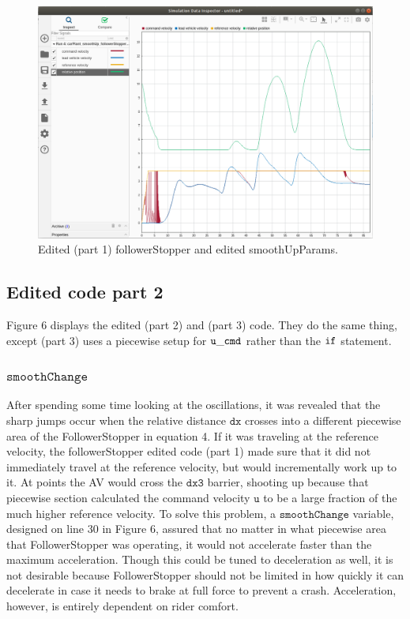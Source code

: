 \documentclass[12pt, letterpaper]{article}
\begin{document}
\begin{figure}[h!]
\begin{center}
\includegraphics[width=6in]{editedFS_editedSUP_1}
\caption{Edited (part 1) followerStopper and edited smoothUpParams.}
\label{default}
\end{center}
\end{figure}

\subsection{Edited code part 2}
Figure 6 displays the edited (part 2) and (part 3) code. They do the same thing, except (part 3) uses a piecewise setup for $\tt{u\_cmd}$ rather than the $\tt{if}$ statement.
\subsubsection{$\mathtt{smoothChange}$}
After spending some time looking at the oscillations, it was revealed that the sharp jumps occur when the relative distance $\mathtt{dx}$ crosses into a different piecewise area of the FollowerStopper in equation 4. If it was traveling at the reference velocity, the followerStopper edited code (part 1) made sure that it did not immediately travel at the reference velocity, but would incrementally work up to it. At points the AV would cross the $\mathtt{dx3}$ barrier, shooting up because that piecewise section calculated the command velocity $\mathtt{u}$ to be a large fraction of the much higher reference velocity. To solve this problem, a $\mathtt{smoothChange}$ variable, designed on line 30 in Figure 6, assured that no matter in what piecewise area that FollowerStopper was operating, it would not accelerate faster than the maximum acceleration. Though this could be tuned to deceleration as well, it is not desirable because FollowerStopper should not be limited in how quickly it can decelerate in case it needs to brake at full force to prevent a crash. Acceleration, however, is entirely dependent on rider comfort.
\end{document}
